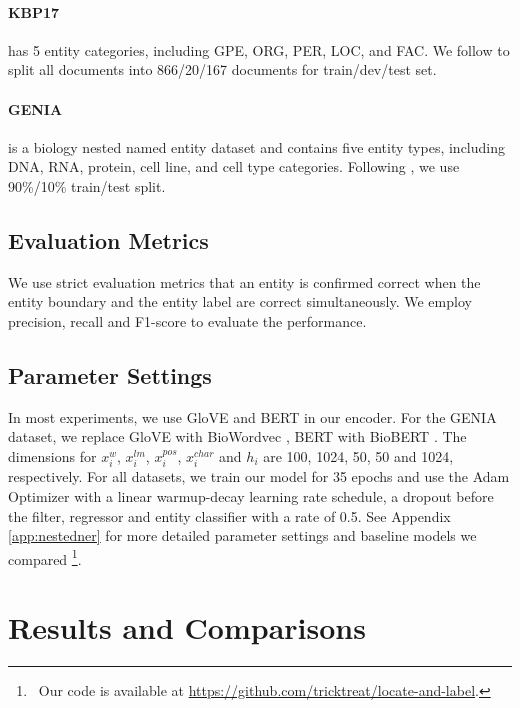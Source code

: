 \documentclass[11pt,a4paper]{article}
\begin{document}
\paragraph{KBP17} \citep{DBLP:conf/tac/JiPZNMMC17} has 5 entity categories, including GPE, ORG, PER, LOC, and FAC. We follow \citet{lin-etal-2019-sequence} to split all documents into 866/20/167 documents for train/dev/test set.

\paragraph{GENIA} \citep{10.5555/1289189.1289260} is a biology nested named entity dataset and contains five entity types, including DNA, RNA, protein, cell line, and cell type categories. Following \citet{yu-etal-2020-named}, we use 90\%/10\% train/test split.

\subsection{Evaluation Metrics}

We use strict evaluation metrics that an entity is confirmed correct when the entity boundary and the entity label are correct simultaneously. We employ precision, recall and F1-score to evaluate the performance.

\subsection{Parameter Settings}
In most experiments, we use GloVE \citep{pennington-etal-2014-glove} and BERT \citep{devlin-etal-2019-bert} in our encoder. For the GENIA dataset, we replace GloVE with BioWordvec \citep{chiu-etal-2016-train}, BERT with BioBERT \citep{10.1093/bioinformatics/btz682}. The dimensions for $x^{w}_i$, $x^{lm}_i$, $x^{pos}_i$, $x^{char}_i$ and $h_i$ are 100, 1024, 50, 50 and 1024, respectively. For all datasets, we train our model for 35 epochs and use the Adam Optimizer with a linear warmup-decay learning rate schedule, a dropout before the filter, regressor and entity classifier with a rate of 0.5. See Appendix \ref{app:nestedner} for more detailed parameter settings and baseline models we compared \footnote{\ Our code is available at \url{https://github.com/tricktreat/locate-and-label}.}.


\section{Results and Comparisons}
\end{document}
